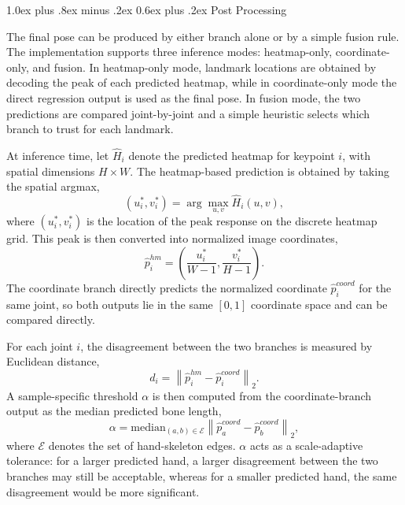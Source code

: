 \documentclass[10pt,letterpaper]{article}
\makeatletter
\renewcommand\subsection{\@startsection{subsection}{2}{\z@}%
  {1.0ex plus .8ex minus .2ex}%
  {0.6ex plus .2ex}%
  {\normalfont\itshape}}
\makeatother
\begin{document}
\subsection{Post Processing}

\noindent
The final pose can be produced by either branch alone or by a simple fusion rule. The implementation supports three inference modes: heatmap-only, coordinate-only, and fusion. In heatmap-only mode, landmark locations are obtained by decoding the peak of each predicted heatmap, while in coordinate-only mode the direct regression output is used as the final pose. In fusion mode, the two predictions are compared joint-by-joint and a simple heuristic selects which branch to trust for each landmark.

At inference time, let \(\hat{H}_i\) denote the predicted heatmap for keypoint \(i\), with spatial dimensions \(H \times W\). The heatmap-based prediction is obtained by taking the spatial argmax,
\begin{equation}
(u_i^*, v_i^*) = \arg\max_{u,v} \hat{H}_i(u,v),
\label{eq:heatmap-argmax}
\end{equation}
where \((u_i^*, v_i^*)\) is the location of the peak response on the discrete heatmap grid. This peak is then converted into normalized image coordinates,
\begin{equation}
\hat{p}^{hm}_i =
\left(
\frac{u_i^*}{W-1},
\frac{v_i^*}{H-1}
\right).
\label{eq:heatmap-decode}
\end{equation}
The coordinate branch directly predicts the normalized coordinate \(\hat{p}^{coord}_i\) for the same joint, so both outputs lie in the same \([0,1]\) coordinate space and can be compared directly.

For each joint \(i\), the disagreement between the two branches is measured by Euclidean distance,
\begin{equation}
d_i = \left\| \hat{p}^{hm}_i - \hat{p}^{coord}_i \right\|_2.
\label{eq:fusion-disagreement}
\end{equation}
A sample-specific threshold \(\alpha\) is then computed from the coordinate-branch output as the median predicted bone length,
\begin{equation}
\alpha = \mathrm{median}_{(a,b)\in \mathcal{E}}
\left\| \hat{p}^{coord}_a - \hat{p}^{coord}_b \right\|_2,
\label{eq:fusion-threshold}
\end{equation}
where \(\mathcal{E}\) denotes the set of hand-skeleton edges. \(\alpha\) acts as a scale-adaptive tolerance: for a larger predicted hand, a larger disagreement between the two branches may still be acceptable, whereas for a smaller predicted hand, the same disagreement would be more significant.
\end{document}
